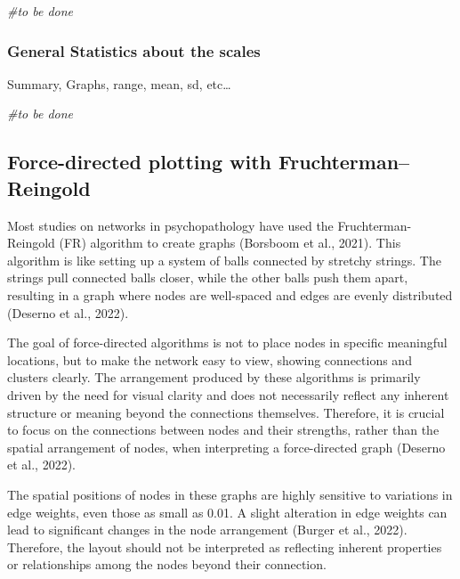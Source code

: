 \documentclass[
]{article}
\newenvironment{Shaded}{\begin{snugshade}}{\end{snugshade}}
\newcommand{\CommentTok}[1]{\textcolor[rgb]{0.56,0.35,0.01}{\textit{#1}}}
\begin{document}
\begin{Shaded}
\begin{Highlighting}[]
\CommentTok{\#to be done}
\end{Highlighting}
\end{Shaded}

\subsubsection{General Statistics about the
scales}\label{general-statistics-about-the-scales}

Summary, Graphs, range, mean, sd, etc\ldots{}

\begin{Shaded}
\begin{Highlighting}[]
\CommentTok{\#to be done}
\end{Highlighting}
\end{Shaded}

\subsection{Force-directed plotting with
Fruchterman--Reingold}\label{force-directed-plotting-with-fruchtermanreingold}

Most studies on networks in psychopathology have used the
Fruchterman-Reingold (FR) algorithm to create graphs (Borsboom et al.,
2021). This algorithm is like setting up a system of balls connected by
stretchy strings. The strings pull connected balls closer, while the
other balls push them apart, resulting in a graph where nodes are
well-spaced and edges are evenly distributed (Deserno et al., 2022).

The goal of force-directed algorithms is not to place nodes in specific
meaningful locations, but to make the network easy to view, showing
connections and clusters clearly. The arrangement produced by these
algorithms is primarily driven by the need for visual clarity and does
not necessarily reflect any inherent structure or meaning beyond the
connections themselves. Therefore, it is crucial to focus on the
connections between nodes and their strengths, rather than the spatial
arrangement of nodes, when interpreting a force-directed graph (Deserno
et al., 2022).

The spatial positions of nodes in these graphs are highly sensitive to
variations in edge weights, even those as small as 0.01. A slight
alteration in edge weights can lead to significant changes in the node
arrangement (Burger et al., 2022). Therefore, the layout should not be
interpreted as reflecting inherent properties or relationships among the
nodes beyond their connection.
\end{document}
